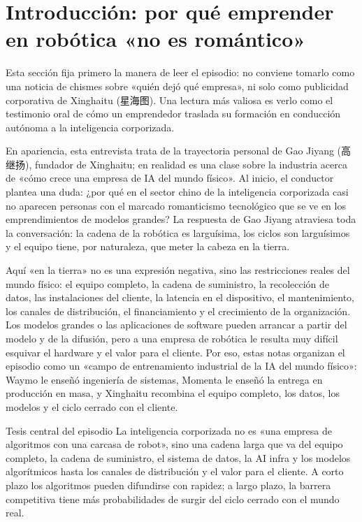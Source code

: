 \section{Introducción: por qué emprender en robótica «no es romántico»}

Esta sección fija primero la manera de leer el episodio: no conviene tomarlo como una noticia de chismes sobre «quién dejó qué empresa», ni solo como publicidad corporativa de Xinghaitu (星海图). Una lectura más valiosa es verlo como el testimonio oral de cómo un emprendedor traslada su formación en conducción autónoma a la inteligencia corporizada.

En apariencia, esta entrevista trata de la trayectoria personal de Gao Jiyang (高继扬), fundador de Xinghaitu; en realidad es una clase sobre la industria acerca de «cómo crece una empresa de IA del mundo físico». Al inicio, el conductor plantea una duda: ¿por qué en el sector chino de la inteligencia corporizada casi no aparecen personas con el marcado romanticismo tecnológico que se ve en los emprendimientos de modelos grandes? La respuesta de Gao Jiyang atraviesa toda la conversación: la cadena de la robótica es larguísima, los ciclos son larguísimos y el equipo tiene, por naturaleza, que meter la cabeza en la tierra.

Aquí «en la tierra» no es una expresión negativa, sino las restricciones reales del mundo físico: el equipo completo, la cadena de suministro, la recolección de datos, las instalaciones del cliente, la latencia en el dispositivo, el mantenimiento, los canales de distribución, el financiamiento y el crecimiento de la organización. Los modelos grandes o las aplicaciones de software pueden arrancar a partir del modelo y de la difusión, pero a una empresa de robótica le resulta muy difícil esquivar el hardware y el valor para el cliente. Por eso, estas notas organizan el episodio como un «campo de entrenamiento industrial de la IA del mundo físico»: Waymo le enseñó ingeniería de sistemas, Momenta le enseñó la entrega en producción en masa, y Xinghaitu recombina el equipo completo, los datos, los modelos y el ciclo cerrado con el cliente.

\begin{importantbox}{Tesis central del episodio}
La inteligencia corporizada no es «una empresa de algoritmos con una carcasa de robot», sino una cadena larga que va del equipo completo, la cadena de suministro, el sistema de datos, la AI infra y los modelos algorítmicos hasta los canales de distribución y el valor para el cliente. A corto plazo los algoritmos pueden difundirse con rapidez; a largo plazo, la barrera competitiva tiene más probabilidades de surgir del ciclo cerrado con el mundo real.
\end{importantbox}


